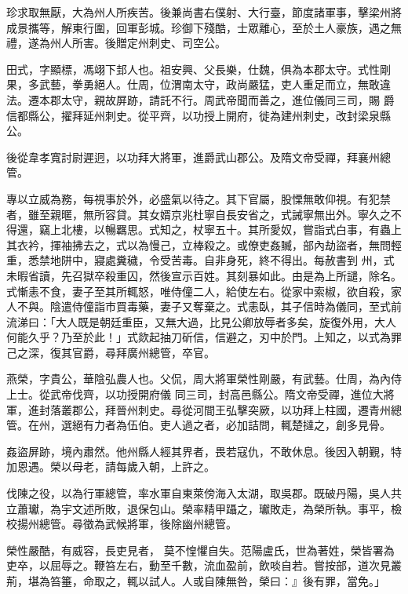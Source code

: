 \begin{pinyinscope}
 珍求取無厭，大為州人所疾苦。後兼尚書右僕射、大行臺，節度諸軍事，擊梁州將成景攜等，解東行圍，回軍彭城。珍御下殘酷，士眾離心，至於土人豪族，遇之無禮，遂為州人所害。後贈定州刺史、司空公。



 田式，字顯標，馮翊下邽人也。祖安興、父長樂，仕魏，俱為本郡太守。式性剛果，多武藝，拳勇絕人。仕周，位渭南太守，政尚嚴猛，吏人重足而立，無敢違法。遷本郡太守，親故屏跡，請託不行。周武帝聞而善之，進位儀同三司，賜
 爵信都縣公，擢拜延州刺史。從平齊，以功授上開府，徙為建州刺史，改封梁泉縣公。



 後從韋孝寬討尉遲迥，以功拜大將軍，進爵武山郡公。及隋文帝受禪，拜襄州總管。



 專以立威為務，每視事於外，必盛氣以待之。其下官屬，股慄無敢仰視。有犯禁者，雖至親暱，無所容貸。其女婿京兆杜寧自長安省之，式誡寧無出外。寧久之不得還，竊上北樓，以暢羈思。式知之，杖寧五十。其所愛奴，嘗詣式白事，有蟲上其衣衿，揮袖拂去之，式以為慢己，立棒殺之。或僚吏姦贓，部內劫盜者，無問輕重，悉禁地阱中，寢處糞穢，令受苦毒。自非身死，終不得出。每赦書到
 州，式未暇省讀，先召獄卒殺重囚，然後宣示百姓。其刻暴如此。由是為上所譴，除名。式慚恚不食，妻子至其所輒怒，唯侍僮二人，給使左右。從家中索椒，欲自殺，家人不與。陰遣侍僮詣市買毒藥，妻子又奪棄之。式恚臥，其子信時為儀同，至式前流涕曰：「大人既是朝廷重臣，又無大過，比見公卿放辱者多矣，旋復外用，大人何能久乎？乃至於此！」式欻起抽刀斫信，信避之，刃中於門。上知之，以式為罪己之深，復其官爵，尋拜廣州總管，卒官。



 燕榮，字貴公，華陰弘農人也。父侃，周大將軍榮性剛嚴，有武藝。仕周，為內侍上士。從武帝伐齊，以功授開府儀
 同三司，封高邑縣公。隋文帝受禪，進位大將軍，進封落叢郡公，拜晉州刺史。尋從河間王弘擊突厥，以功拜上柱國，遷青州總管。在州，選絕有力者為伍伯。吏人過之者，必加詰問，輒楚撻之，創多見骨。



 姦盜屏跡，境內肅然。他州縣人經其界者，畏若寇仇，不敢休息。後因入朝覲，特加恩遇。榮以母老，請每歲入朝，上許之。



 伐陳之役，以為行軍總管，率水軍自東萊傍海入太湖，取吳郡。既破丹陽，吳人共立蕭瓛，為宇文述所敗，退保包山。榮率精甲躡之，瓛敗走，為榮所執。事平，檢校揚州總管。尋徵為武候將軍，後除幽州總管。



 榮性嚴酷，有威容，長吏見者，
 莫不惶懼自失。范陽盧氏，世為著姓，榮皆署為吏卒，以屈辱之。鞭笞左右，動至千數，流血盈前，飲啖自若。嘗按部，道次見叢荊，堪為笞箠，命取之，輒以試人。人或自陳無咎，榮曰：』後有罪，當免。」




\end{pinyinscope}
